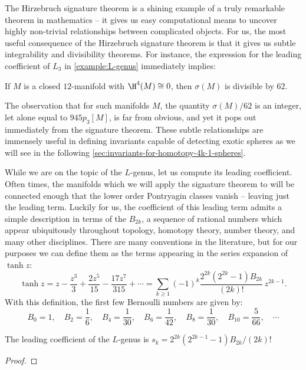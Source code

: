 The Hirzebruch signature theorem is a shining example of a truly remarkable theorem in mathematics -- it gives us easy computational means to uncover highly non-trivial relationships between complicated objects. For us, the most useful consequence of the Hirzebruch signature theorem is that it gives us subtle integrability and divisibility theorems. For instance, the expression for the leading coefficient of $L_3$ in \cref{example:L-genus} immediately implies:
\begin{corollary}
	If $M$ is a closed $12$-manifold with $\H^4(M)\cong 0$, then $\sigma(M)$ is divisible by $62$.
\end{corollary}
The observation that for such manifolds $M$, the quantity $\sigma(M)/62$ is an integer, let alone equal to $945p_3[M]$, is far from obvious, and yet it pops out immediately from the signature theorem. These subtle relationships are immensely useful in defining invariants capable of detecting exotic spheres as we will see in the following \cref{sec:invariants-for-homotopy-4k-1-spheres}.

While we are on the topic of the $L$-genus, let us compute its leading coefficient. Often times, the manifolds which we will apply the signature theorem to will be connected enough that the lower order Pontryagin classes vanish -- leaving just the leading term.
Luckily for us, the coefficient of this leading term admits a simple description in terms of the  $B_{2k}$, a sequence of rational numbers which appear ubiquitously throughout topology, homotopy theory, number theory, and many other disciplines. There are many conventions in the literature, but for our purposes we can define them as the terms appearing in the series expansion of $\tanh z$:
\begin{equation}\label{eq:tanh_series}
	\tanh z = z - \frac{z^3}{3} + \frac{2z^5}{15} - \frac{17z^7}{315}+\cdots = \sum_{k\geq 1} (-1)^k\frac{2^{2k}(2^{2k}-1)B_{2k}}{(2k)!}\, z^{2k-1}.
\end{equation}
With this definition, the first few Bernoulli numbers are given by:
\begin{equation}\label{eq:bernoulli_numbers}
	B_0 = 1,\quad B_2 = \frac{1}{6},\quad B_4 = \frac{1}{30},\quad B_6=\frac{1}{42},\quad B_{8}=\frac{1}{30},\quad B_{10} = \frac{5}{66},\quad\cdots
\end{equation}


\begin{proposition}\label{prop:leading_coefficient_L_genus}
	The leading coefficient of the $L$-genus is $s_k=2^{2k}(2^{2k-1}-1)B_{2k}/(2k)!$
\end{proposition}
\begin{proof}
\end{proof}
%
%
